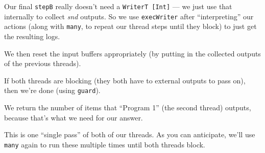 \documentclass[]{article}
\newenvironment{Shaded}{}{}
\newcommand{\CommentTok}[1]{\textcolor[rgb]{0.38,0.63,0.69}{\textit{#1}}}
\newcommand{\DataTypeTok}[1]{\textcolor[rgb]{0.56,0.13,0.00}{#1}}
\newcommand{\FunctionTok}[1]{\textcolor[rgb]{0.02,0.16,0.49}{#1}}
\newcommand{\KeywordTok}[1]{\textcolor[rgb]{0.00,0.44,0.13}{\textbf{#1}}}
\newcommand{\NormalTok}[1]{#1}
\newcommand{\OtherTok}[1]{\textcolor[rgb]{0.00,0.44,0.13}{#1}}
\begin{document}
\begin{Shaded}
\end{Shaded}

Our final \texttt{stepB} really doesn't need a \texttt{WriterT\ {[}Int{]}} ---
we just use that internally to collect \emph{snd} outputs. So we use
\texttt{execWriter} after ``interpreting'' our actions (along with
\texttt{many}, to repeat our thread steps until they block) to just get the
resulting logs.

We then reset the input buffers appropriately (by putting in the collected
outputs of the previous threads).

If both threads are blocking (they both have to external outputs to pass on),
then we're done (using \texttt{guard}).

We return the number of items that ``Program 1'' (the second thread) outputs,
because that's what we need for our answer.

This is one ``single pass'' of both of our threads. As you can anticipate, we'll
use \texttt{many} again to run these multiple times until both threads block.
\end{document}
